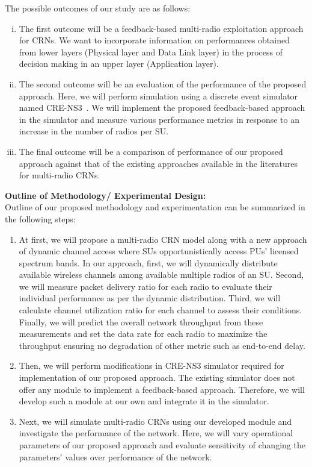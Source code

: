 \documentclass[12pt,addpoints,fleqn]{exam}
\begin{document}
\begin{questions}
The possible outcomes of our study are as follows:
\begin{enumerate}[i.]
    \item The first outcome will be a feedback-based multi-radio exploitation approach for CRNs. We want to incorporate information on performances obtained from lower layers (Physical layer and Data Link layer) in the process of decision making in an upper layer (Application layer).
    \item The second outcome will be an evaluation of the performance of the proposed approach. Here, we will perform simulation using a discrete event simulator named CRE-NS3~\cite{al2014simulating}. We will implement the proposed feedback-based approach in the simulator and measure various performance metrics in response to an increase in the number of radios per SU.
    \item The final outcome will be a comparison of performance of our proposed approach against that of the existing approaches available in the literatures for multi-radio CRNs.
\end{enumerate}
{\bfseries \question
\textbf{Outline of Methodology/ Experimental Design:}}\\
Outline of our proposed methodology and experimentation can be summarized in the following steps:
\begin{enumerate}
    \item At first, we will propose a multi-radio CRN model along with a new approach of dynamic channel access where SUs opportunistically access PUs' licensed spectrum bands. In our approach, first, we will dynamically distribute available wireless channels among available multiple radios of an SU. Second, we will measure packet delivery ratio for each radio to evaluate their individual performance as per the dynamic distribution. Third, we will calculate channel utilization ratio for each channel to assess their conditions. Finally, we will predict the overall network throughput from these measurements and set the data rate for each radio to maximize the throughput ensuring no degradation of other metric such as end-to-end delay.
    \item Then, we will perform modifications in CRE-NS3 simulator required for implementation of our proposed approach. The existing simulator does not offer any module to implement a feedback-based approach. Therefore, we will develop such a module at our own and integrate it in the simulator.
    \item Next, we will simulate multi-radio CRNs using our developed module and investigate the performance of the network. Here, we will vary operational parameters of our proposed approach and evaluate sensitivity of changing the parameters' values over performance of the network.

\end{enumerate}
\end{questions}
\end{document}
